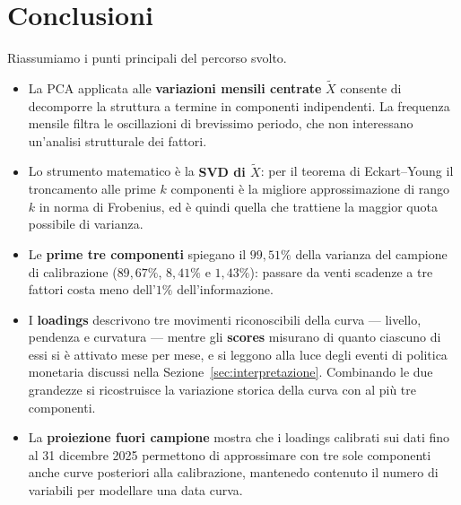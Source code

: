 \documentclass[11pt,a4paper]{article}
\theoremstyle{plain}
\theoremstyle{definition}
\theoremstyle{remark}
\begin{document}
\section{Conclusioni}

Riassumiamo i punti principali del percorso svolto.

\begin{itemize}
  \item La PCA applicata alle \textbf{variazioni mensili centrate}
        $\tilde{X}$ consente di decomporre la struttura a termine in componenti
        indipendenti. La frequenza mensile filtra le oscillazioni di brevissimo
        periodo, che non interessano un'analisi strutturale dei fattori.
  \item Lo strumento matematico è la \textbf{SVD di $\tilde{X}$}: per il
        teorema di Eckart--Young il troncamento alle prime $k$ componenti è la
        migliore approssimazione di rango $k$ in norma di Frobenius, ed è
        quindi quella che trattiene la maggior quota possibile di varianza.
  \item Le \textbf{prime tre componenti} spiegano il $99{,}51\%$ della varianza
        del campione di calibrazione ($89{,}67\%$, $8{,}41\%$ e $1{,}43\%$):
        passare da venti scadenze a tre fattori costa meno dell'$1\%$
        dell'informazione.
  \item I \textbf{loadings} descrivono tre movimenti riconoscibili della curva
        --- livello, pendenza e curvatura --- mentre gli \textbf{scores}
        misurano di quanto ciascuno di essi si è attivato mese per mese, e si
        leggono alla luce degli eventi di politica monetaria discussi nella
        Sezione~\ref{sec:interpretazione}. Combinando le due grandezze si
        ricostruisce la variazione storica della curva con al più tre
        componenti.
  \item La \textbf{proiezione fuori campione} mostra che i loadings calibrati
        sui dati fino al 31 dicembre 2025 permettono di approssimare con tre sole componenti
        anche curve posteriori alla calibrazione, mantenedo contenuto il numero di variabili per modellare una data curva.
\end{itemize}
\end{document}
